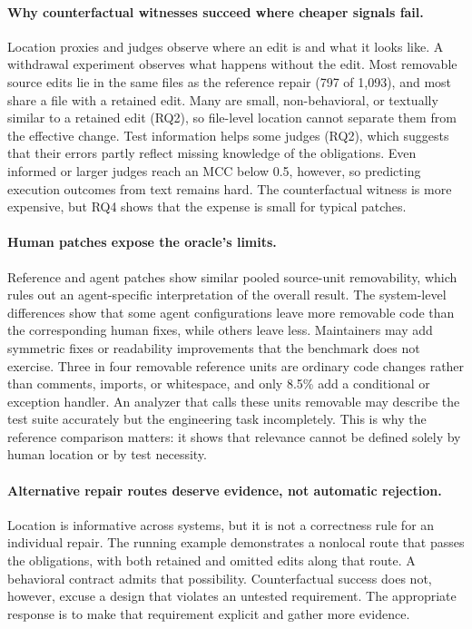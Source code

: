 \documentclass[a4paper,fleqn]{cas-sc}
\begin{document}
\paragraph{Why counterfactual witnesses succeed where cheaper signals fail.}
Location proxies and judges observe where an edit is and what it looks like. A withdrawal experiment observes what happens without the edit. Most removable source edits lie in the same files as the reference repair (797 of 1,093), and most share a file with a retained edit. Many are small, non-behavioral, or textually similar to a retained edit (RQ2), so file-level location cannot separate them from the effective change. Test information helps some judges (RQ2), which suggests that their errors partly reflect missing knowledge of the obligations. Even informed or larger judges reach an MCC below 0.5, however, so predicting execution outcomes from text remains hard. The counterfactual witness is more expensive, but RQ4 shows that the expense is small for typical patches.

\paragraph{Human patches expose the oracle's limits.}
Reference and agent patches show similar pooled source-unit removability, which rules out an agent-specific interpretation of the overall result. The system-level differences show that some agent configurations leave more removable code than the corresponding human fixes, while others leave less. Maintainers may add symmetric fixes or readability improvements that the benchmark does not exercise. Three in four removable reference units are ordinary code changes rather than comments, imports, or whitespace, and only 8.5\% add a conditional or exception handler. An analyzer that calls these units removable may describe the test suite accurately but the engineering task incompletely. This is why the reference comparison matters: it shows that relevance cannot be defined solely by human location or by test necessity.

\paragraph{Alternative repair routes deserve evidence, not automatic rejection.}
Location is informative across systems, but it is not a correctness rule for an individual repair. The running example demonstrates a nonlocal route that passes the obligations, with both retained and omitted edits along that route. A behavioral contract admits that possibility. Counterfactual success does not, however, excuse a design that violates an untested requirement. The appropriate response is to make that requirement explicit and gather more evidence.
\end{document}
